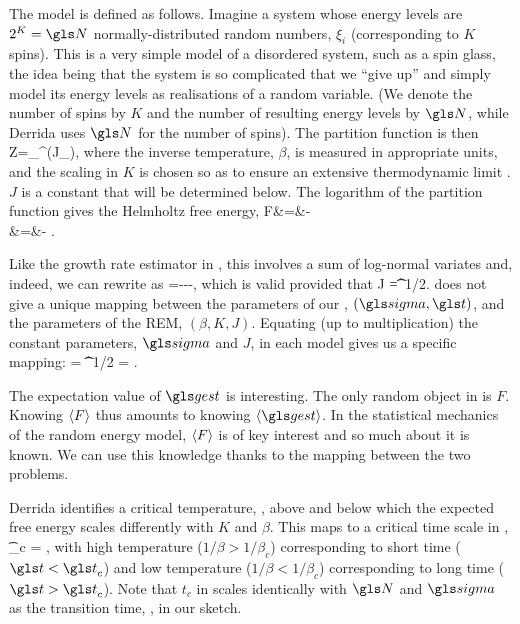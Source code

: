 The model is defined as follows. Imagine a system whose energy levels are $2^K=\N$ normally-distributed random numbers, $\xi_i$ (corresponding to $K$ spins). This is a very simple model of a disordered system, such as a spin glass, the idea being that the system is so complicated that we ``give up'' and simply model its energy levels as realisations of a random variable. (We denote the number 
of spins by $K$ and the number of resulting energy levels by $\N$, while Derrida uses $\N$ for the number of spins). The partition function is then
\be
Z=\sum_{}^\N \exp\left(\beta J\xi_\gi\right),
\ee
where the inverse temperature, $\beta$, is measured in appropriate units, and the scaling in $K$ is chosen
so as to ensure an extensive thermodynamic limit \cite[p.~79]{Derrida1980}. $J$ is a constant that will be determined below.
The logarithm of the partition function gives the Helmholtz free energy, 
\bea
F&=&-\\
&=&-  \ln\left[\sum_{\gi=1}^\N \exp\left(\beta J \sqrt{\frac{K}{2}}\xi_\gi\right)\right].
\eea

Like the growth rate estimator in , this involves a sum of 
log-normal variates and, indeed, we can rewrite  as
\be
\gest=\gmu--\frac{\ln \N}{\t}-,
\ee
which is valid provided that
\be
\beta J =\gsigma \t^{1/2}.
\ee
{} does not give a unique mapping between the parameters of our \GBM, $(\gsigma, \t)$, and the parameters of the REM, $(\beta, K, J)$. Equating (up to multiplication) the constant parameters, $\gsigma$ and $J$, in each model gives us a specific mapping:
\be
\gsigma= \quad {} \quad \t^{1/2} = \beta{}.
\ee

The expectation value of $\gest$ is interesting. The only random object
in  is $F$. Knowing $\left\langle F \right\rangle$ thus amounts to knowing $\ave{\gest}$.
In the statistical mechanics of the random energy model, $\left\langle F \right\rangle$ is of key
interest and so much about it is known. We can use this knowledge
thanks to the mapping between the two problems.

Derrida identifies a critical temperature,
\be
{} \equiv {},
\ee
above and below which the expected free energy scales differently with $K$ and $\beta$. This maps to a critical time scale in \GBM,
\be
\t_c = ,
\ee
with high temperature ($1/\beta>1/\beta_c$) corresponding to short time ($\t<\t_c$) and low temperature ($1/\beta<1/\beta_c$) corresponding to long time ($\t>\t_c$). Note that $t_c$ in  scales identically with $\N$ and $\gsigma$ as the transition time, , in our sketch.

